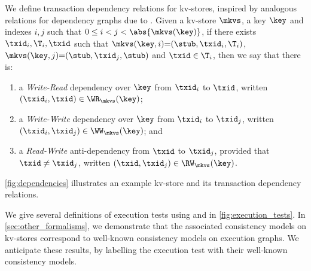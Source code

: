 We define transaction dependency relations for kv-stores,  inspired by
analogous relations for  dependency graphs due to \citet{adya}.
Given a kv-store \(\mkvs\), a key \(\key\) and 
indexes \(i,j\) such that  \(0 \leq i < j < \abs{ \mkvs(\key) }\), 
if there exists \(\txid_i, \T_i, \txid\) such that 
\(\mkvs(\key, i)  {=} (\stub, \txid_{i}, \T_{i})\), \(\mkvs(\key,j) {=} (\stub, \txid_{j}, \stub)\)
and \(\txid \in \T_{i}\), 
then we say that there is:
\begin{enumerate} 
\item a \emph{Write-Read} dependency over 
\(\key\) from \(\txid_{i}\) to \(\txid\), written \((\txid_{i},\txid) \in \WR_{\mkvs}(\key)\);
\item a \emph{Write-Write} dependency over \(\key\) from \(\txid_{i}\) to \(\txid_{j}\), 
    written \((\txid_{i},\txid_{j}) \in \WW_{\mkvs}(\key) \); and 
\item a \emph{Read-Write} anti-dependency from \(\txid\) to \(\txid_{j}\), provided that 
\(\txid \neq \txid_{j}\), written \((\txid,\txid_j) \in \RW_{\mkvs}(\key)\).
\end{enumerate}
\noindent \cref{fig:dependencies} illustrates an example kv-store and
its transaction dependency relations.
%

We give several definitions of
execution tests using \vshiftname and \cancommitname in \cref{fig:execution_tests}. 
In \cref{sec:other_formalisms}, we demonstrate that the associated consistency
models on kv-stores correspond to well-known consistency models on 
execution graphs. We anticipate these results, by labelling the
execution test with their well-known consistency models.


